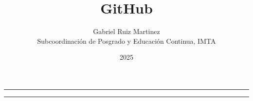 \documentclass{article}
\title{\textbf{GitHub}}
\date{2025}
\author{Gabriel Ruiz Martinez\\ Subcoordinación de Posgrado y Educación Continua, IMTA}
\begin{document}
	
	\renewcommand{\contentsname}{Contenido} 
	
	\maketitle
	
	\vspace{0.25cm}
	\hrule height 1pt
	
	\tableofcontents
	
	\vspace{0.25cm}
	\hrule
	
	
	
\end{document}
